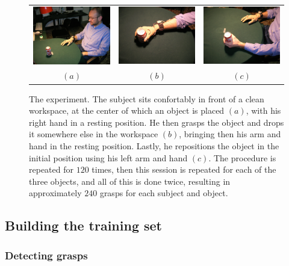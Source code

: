 \begin{figure}[htbp]
  \begin{center}
    \begin{tabular}{ccc}
      \includegraphics[width=0.3\linewidth]{exp1.eps} &
      \includegraphics[width=0.3\linewidth]{exp2.eps}  &
      \includegraphics[width=0.3\linewidth]{exp3.eps} \\
      $(a)$ & $(b)$ & $(c)$
    \end{tabular}
    \caption{The experiment. The subject sits confortably in
    front of a clean workspace, at the center of which an object is
    placed $(a)$, with his right hand in a resting position. He then
    grasps the object and drops it somewhere else in the workspace
    $(b)$, bringing then his arm and hand in the resting
    position. Lastly, he repositions the object in the initial
    position using his left arm and hand $(c)$. The procedure is repeated
    for $120$ times, then this session is repeated for each of the
    three objects, and all of this is done twice, resulting in
    approximately $240$ grasps for each subject and object.}
    \label{fig:setup}
  \end{center}
\end{figure}

\subsection{Building the training set}

\subsubsection{Detecting grasps}

